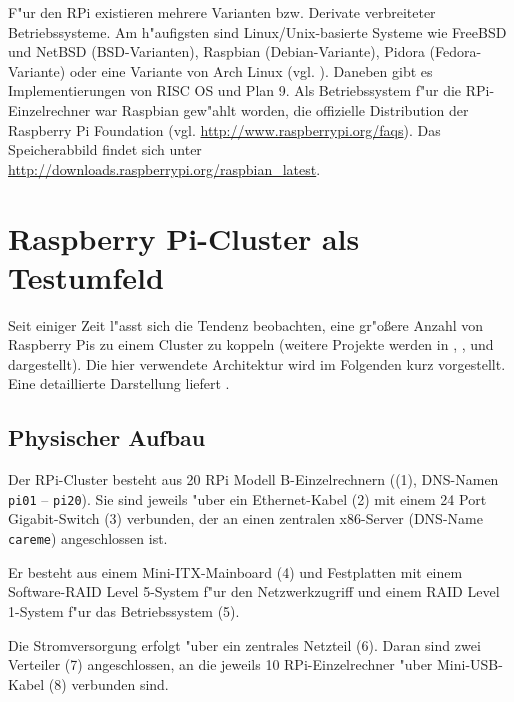 F"ur den RPi existieren mehrere Varianten bzw. Derivate verbreiteter Betriebssysteme. Am h"aufigsten sind Linux/Unix-basierte Systeme wie FreeBSD und NetBSD (BSD-Varianten), Raspbian (Debian-Variante), Pidora (Fedora-Variante) oder eine Variante von Arch Linux (vgl. \cite{pow12}). Daneben gibt es Implementierungen von RISC OS und Plan 9. Als Betriebssystem f"ur die RPi-Einzelrechner war Raspbian gew"ahlt worden, die offizielle Distribution der Raspberry Pi Foundation (vgl. \url{http://www.raspberrypi.org/faqs}). Das Speicherabbild findet sich unter \url{http://downloads.raspberrypi.org/raspbian_latest}. 

\section{Raspberry Pi-Cluster als Testumfeld}\label{Bramble-Spezi}

Seit einiger Zeit l"asst sich die Tendenz beobachten, eine gr"o\ss ere Anzahl von Raspberry Pis zu einem Cluster zu koppeln (weitere Projekte werden in \cite{cox13}, \cite{kie01}, \cite{bal12} und \cite{ou13} dargestellt). Die hier verwendete Architektur wird im Folgenden kurz vorgestellt. Eine detaillierte Darstellung liefert \cite{kli13}. 

\subsection{Physischer Aufbau}\label{Bramble-Hardware}

Der RPi-Cluster besteht aus 20 RPi Modell B-Einzelrechnern ((1), DNS-Namen \texttt{pi01} -- \texttt{pi20}). Sie sind jeweils "uber ein Ethernet-Kabel (2) mit einem 24 Port Gigabit-Switch (3) verbunden, der an einen zentralen x86-Server (DNS-Name \texttt{careme}) angeschlossen ist. 

Er besteht aus einem Mini-ITX-Mainboard (4) und %
Festplatten mit einem Software-RAID Level 5-System f"ur den Netzwerkzugriff und einem RAID Level 1-System f"ur das Betriebssystem (5).  

Die Stromversorgung erfolgt "uber ein zentrales Netzteil (6). Daran sind zwei Verteiler (7) angeschlossen, an die jeweils 10 RPi-Einzelrechner "uber Mini-USB-Kabel (8) verbunden sind. 

